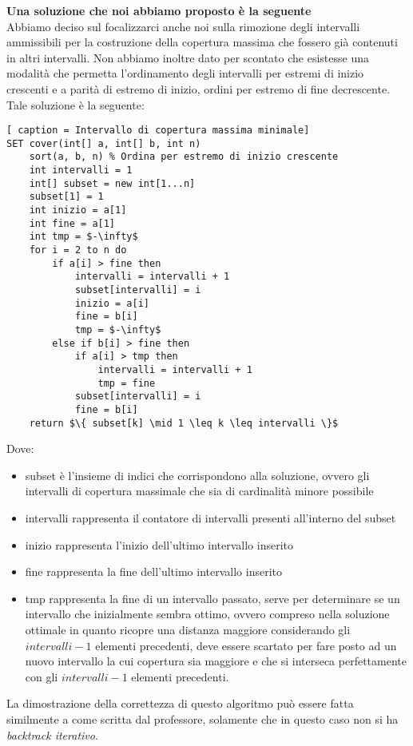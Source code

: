 \documentclass[../cheatSheetAlgoritmi.tex]{subfiles}
\begin{document}
\textbf{Una soluzione che noi abbiamo proposto è la seguente} \\
Abbiamo deciso sul focalizzarci anche noi sulla rimozione degli intervalli ammissibili per la costruzione della copertura massima che fossero già contenuti in altri intervalli. Non abbiamo inoltre dato per scontato che esistesse una modalità che permetta l'ordinamento degli intervalli per estremi di inizio crescenti e a parità di estremo di inizio, ordini per estremo di fine decrescente. \\
Tale soluzione è la seguente:
\begin{lstlisting}[ caption = Intervallo di copertura massima minimale]
SET cover(int[] a, int[] b, int n)
	sort(a, b, n) % Ordina per estremo di inizio crescente
	int intervalli = 1
	int[] subset = new int[1...n]
	subset[1] = 1
	int inizio = a[1]
	int fine = a[1]
	int tmp = $-\infty$
	for i = 2 to n do
		if a[i] > fine then
			intervalli = intervalli + 1
			subset[intervalli] = i
			inizio = a[i]
			fine = b[i]
			tmp = $-\infty$
		else if b[i] > fine then
			if a[i] > tmp then
				intervalli = intervalli + 1
				tmp = fine
			subset[intervalli] = i
			fine = b[i]
	return $\{ subset[k] \mid 1 \leq k \leq intervalli \}$ 
\end{lstlisting}
Dove:
\begin{itemize}
	\item subset è l'insieme di indici che corrispondono alla soluzione, ovvero gli intervalli di copertura massimale che sia di cardinalità minore possibile
	\item intervalli rappresenta il contatore di intervalli presenti all'interno del subset
	\item inizio rappresenta l'inizio dell'ultimo intervallo inserito
	\item fine rappresenta la fine dell'ultimo intervallo inserito
	\item tmp rappresenta la fine di un intervallo passato, serve per determinare se un intervallo che inizialmente sembra ottimo, ovvero compreso nella soluzione ottimale in quanto ricopre una distanza maggiore considerando gli $intervalli - 1$ elementi precedenti, deve essere scartato per fare posto ad un nuovo intervallo la cui copertura sia maggiore e che si interseca perfettamente con gli $intervalli - 1$ elementi precedenti.
\end{itemize}
La dimostrazione della correttezza di questo algoritmo può essere fatta similmente a come scritta dal professore, solamente che in questo caso non si ha \emph{backtrack iterativo}. \newpage
\end{document}

